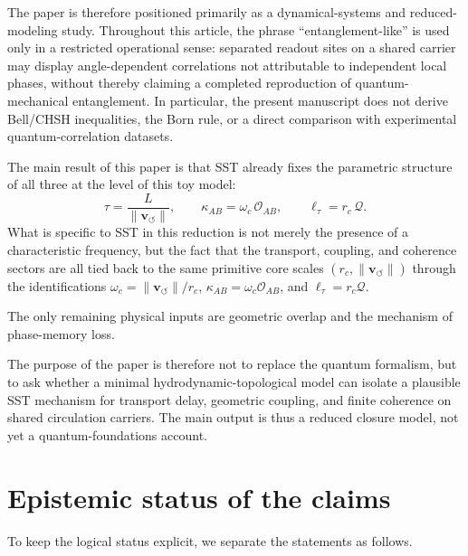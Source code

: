 \documentclass[11pt]{article}
\newcommand{\vnorm}{\lVert \mathbf{v}_{\!\boldsymbol{\circlearrowleft}}\rVert}
\newcommand{\rc}{r_c}
\begin{document}
        The paper is therefore positioned primarily as a dynamical-systems and reduced-modeling study. Throughout this article, the phrase ``entanglement-like'' is used only in a restricted operational sense: separated readout sites on a shared carrier may display angle-dependent correlations not attributable to independent local phases, without thereby claiming a completed reproduction of quantum-mechanical entanglement. In particular, the present manuscript does not derive Bell/CHSH inequalities, the Born rule, or a direct comparison with experimental quantum-correlation datasets.

        The main result of this paper is that SST already fixes the parametric structure of all three at the level of this toy model:
        \[
            \tau=\frac{L}{\vnorm},\qquad
            \kappa_{AB}=\omega_c\,\mathcal{O}_{AB},\qquad
            \ell_\tau=\rc\,\mathcal{Q}.
        \]
        What is specific to SST in this reduction is not merely the presence of a characteristic frequency, but the fact that the transport, coupling, and coherence sectors are all tied back to the same primitive core scales \((\rc,\vnorm)\) through the identifications \(\omega_c=\vnorm/\rc\), \(\kappa_{AB}=\omega_c\mathcal{O}_{AB}\), and \(\ell_\tau=\rc\mathcal{Q}\).

        The only remaining physical inputs are geometric overlap and the mechanism of phase-memory loss.

        The purpose of the paper is therefore not to replace the quantum formalism, but to ask whether a minimal hydrodynamic-topological model can isolate a plausible SST mechanism for transport delay, geometric coupling, and finite coherence on shared circulation carriers. The main output is thus a reduced closure model, not yet a quantum-foundations account.
    
    \section{Epistemic status of the claims}
        
        To keep the logical status explicit, we separate the statements as follows.
        
\end{document}
